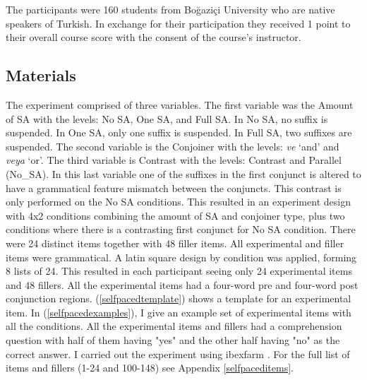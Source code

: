 The participants were 160 students from Boğaziçi University who are native speakers of Turkish. In exchange for their participation they received 1 point to their overall course score with the consent of the course's instructor.


\subsection{Materials}

The experiment comprised of three variables. The first variable was the Amount of SA with the levels: No SA, One SA, and Full SA.
In No SA, no suffix is suspended. In One SA, only one suffix is suspended. In Full SA, two suffixes are suspended. The second variable is the Conjoiner with the levels: \textit{ve} `and' and \textit{veya} `or'. The third variable is Contrast with the levels: Contrast and Parallel (No\_SA). In this last variable one of the suffixes in the first conjunct is altered to have a grammatical feature mismatch between the conjuncts. This contrast is only performed on the No SA conditions. This resulted in an experiment design with 4x2 conditions combining the amount of SA and conjoiner type, plus two conditions where there is a contrasting first conjunct for No SA condition. There were 24 distinct items together with 48 filler items. All experimental and filler items were grammatical. A latin square design by condition was applied, forming 8 lists of 24. This resulted in each participant seeing only 24 experimental items and 48 fillers. All the experimental items had a four-word pre and four-word post conjunction regions. (\ref{selfpacedtemplate}) shows a template for an experimental item. In (\ref{selfpacedexamples}), I give an example set of experimental items with all the conditions. All the experimental items and fillers had a comprehension question with half of them having "yes" and the other half having "no" as the correct answer. I carried out the experiment using ibexfarm \citep{drummond2013ibex}. For the full list of items and fillers (1-24 and 100-148) see Appendix \ref{selfpaceditems}.

